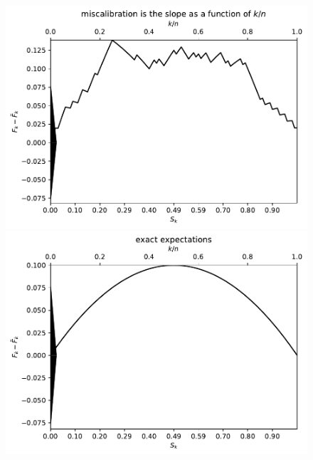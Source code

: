 \documentclass{article}
\begin{document}
\begin{figure}
\begin{centering}

\parbox{\imsize}{\includegraphics[width=\imsize]
                {./codes/unweighted/100_4_0_0/cumulative.pdf}}
\quad\quad
\parbox{\imsize}{\includegraphics[width=\imsize]
                {./codes/unweighted/100_4_0_0/cumulative_exact.pdf}}

\vspace{\vertsep}


\end{centering}
\end{figure}
\end{document}

